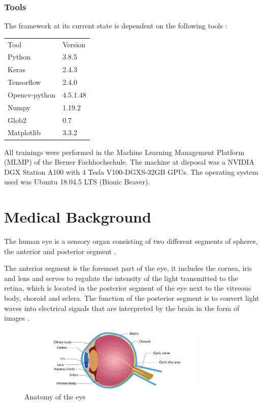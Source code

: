 \documentclass[12pt,a4paper]{scrartcl}
\begin{document}
\subsubsection{Tools}
The framework at its current state is dependent on the following tools : 
    
    \begin{table}[H]
    \begin{tabular}{ll}
    Tool & Version \\
    Python & 3.8.5 \\
    Keras     & 2.4.3   \\
    Tensorflow & 2.4.0 \\
    Opencv-python  &   4.5.1.48 \\
    Numpy & 1.19.2 \\
    Glob2  &  0.7 \\
    Matplotlib & 3.3.2
    \end{tabular}
    \end{table}

All trainings were performed in the Machine Learning Management Platform (MLMP) of the Berner Fachhochschule. The machine at disposal was a NVIDIA DGX Station A100 with 4 Tesla V100-DGXS-32GB GPUs. The operating system used was Ubuntu 18.04.5 LTS (Bionic Beaver).

\section{Medical Background}\label{s:medical_background}

The human eye is a sensory organ consisting of two different segments of spheres, the anterior and posterior segment \cite{snell1998}.

The anterior segment is the foremost part of the eye, it includes the cornea, iris and lens and serves to regulate the intensity of the light transmitted to the retina, which is located in the posterior segment of the eye next to the vitreous body, choroid and sclera. The function of the posterior segment is to convert light waves into electrical signals that are interpreted by the brain in the form of images \cite{Rhoades2017}. 

\begin{figure}[H]
    \centering
    \includegraphics[width=0.8\textwidth]{./images/anatomy-of-the-eye.jpg}
    \caption{Anatomy of the eye \cite{eyeanatomy-pic}}
    \label{fig:eye-anatomy}
\end{figure}
\end{document}

